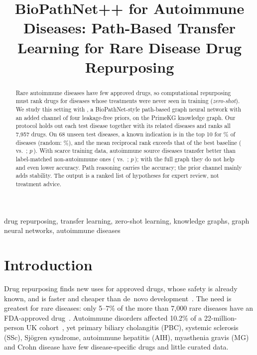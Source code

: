 \documentclass[conference]{IEEEtran}
\begin{document}
\title{BioPathNet++ for Autoimmune Diseases: Path-Based Transfer Learning for Rare Disease Drug Repurposing}

\author{
}

\maketitle

\begin{abstract}
Rare autoimmune diseases have few approved drugs, so computational repurposing must rank drugs for diseases whose treatments were never seen in training (\emph{zero-shot}). We study this setting with \sysname, a BioPathNet-style path-based graph neural network with an added channel of four leakage-free priors, on the PrimeKG knowledge graph. Our protocol holds out each test disease together with its related diseases and ranks all 7,957 drugs. On 68 unseen test diseases, a known indication is in the top 10 for \TabModelTestAnyTen\% of diseases (random: \RandExpAnyTenTest\%), and the mean reciprocal rank exceeds that of the best baseline (\TestMrr{} vs.\ \KnnTestMrr; $p$\,\PwilTestKnn). With scarce training data, autoimmune source diseases transfer better than label-matched non-autoimmune ones (\TrAEMrr{} vs.\ \TrActlEMrr; $p$\,\PwilTrAActlE); with the full graph they do not help and even lower accuracy. Path reasoning carries the accuracy; the prior channel mainly adds stability. The output is a ranked list of hypotheses for expert review, not treatment advice.
\end{abstract}

\begin{IEEEkeywords}
drug repurposing, transfer learning, zero-shot learning, knowledge graphs, graph neural networks, autoimmune diseases
\end{IEEEkeywords}

\section{Introduction}
Drug repurposing finds new uses for approved drugs, whose safety is already known, and is faster and cheaper than de~novo development~\cite{pushpakom2019repurposing}. The need is greatest for rare diseases: only 5--7\% of the more than 7,000 rare diseases have an FDA-approved drug~\cite{huang2024txgnn}. Autoimmune disorders affected 10.2\% of a 22-million-person UK cohort~\cite{conrad2023autoimmune}, yet primary biliary cholangitis (PBC), systemic sclerosis (SSc), Sj\"ogren syndrome, autoimmune hepatitis (AIH), myasthenia gravis (MG) and Crohn disease have few disease-specific drugs and little curated data.
\end{document}

